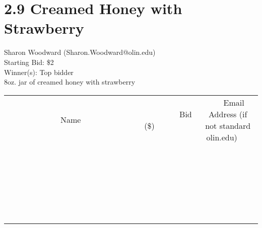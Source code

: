 \documentclass[11pt]{article}
\begin{document}
\section*{2.9 Creamed Honey with Strawberry}
Sharon Woodward (Sharon.Woodward@olin.edu) \\
Starting Bid: \$2 \\
Winner(s): 
Top bidder \\
 8oz. jar of creamed honey with strawberry \\[6ex]
\begin{tabular}{c c c}
~~~~~~~~~~~~~Name~~~~~~~~~~~~~ & ~~~~~~~~~Bid (\$)~~~~~~~~~ & ~~~Email Address (if not standard olin.edu)~~~ \\
 & & \\
\hline
 & & \\
\hline
 & & \\
\hline
 & & \\
\hline
 & & \\
\hline
 & & \\
\hline
 & & \\
\hline
 & & \\
\hline
 & & \\
\hline
 & & \\
\hline
 & & \\
\hline
 & & \\
\hline
 & & \\
\hline
 & & \\
\hline
 & & \\
\hline
 & & \\
\hline
 & & \\
\hline
 & & \\
\hline
 & & \\
\hline
 & & \\
\hline
 & & \\
\hline
 & & \\
\hline
 & & \\
\hline
 & & \\
\hline
 & & \\
\hline
 & & \\
\hline
\end{tabular}
\clearpage
\end{document}
